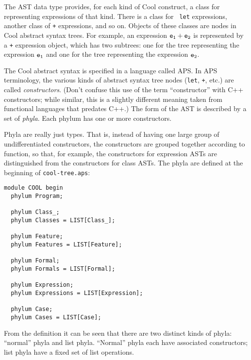 \documentclass[11pt]{article}
\begin{document}
The AST data type provides, for each kind of Cool construct, a class
for representing expressions of that kind.  There is a class for {\tt
let} expressions, another class of {\tt +} expressions, and so on.
Objects of these classes are nodes in Cool abstract syntax trees.
For example, an expression $\tt e_1 + e_2$ is represented by a {\tt +}
expression object, which has two subtrees: one for the tree representing 
the expression $\tt e_1$ and one for the tree representing the
expression $\tt e_2$.

The Cool abstract syntax is specified in a language called APS.
In APS terminology, the various kinds of abstract syntax tree nodes
({\tt let}, {\tt +}, etc.) are called {\em constructors}.  (Don't
confuse this use of the term ``constructor'' with C++ constructors;
while similar, this is a slightly different meaning taken from
functional languages that predates C++.)  The form of the AST
is described by a set of {\it phyla}.  Each phylum has one or more
constructors.

Phyla are really just types.  That is, instead of having one large
group of undifferentiated constructors, the constructors are grouped
together according to function, so that, for example, the constructors
for expression ASTs are distinguished from the
constructors for class ASTs.  The phyla are defined at the
beginning of {\tt cool-tree.aps}:
\begin{verbatim}
module COOL begin
  phylum Program;

  phylum Class_;
  phylum Classes = LIST[Class_];

  phylum Feature;
  phylum Features = LIST[Feature];

  phylum Formal;
  phylum Formals = LIST[Formal];

  phylum Expression;
  phylum Expressions = LIST[Expression];

  phylum Case;
  phylum Cases = LIST[Case];

\end{verbatim}

From the definition it can be seen that there are two distinct kinds of
phyla: ``normal'' phyla and list phyla.  ``Normal'' phyla each have 
associated constructors; list phyla have a fixed set of list operations.
\end{document}
